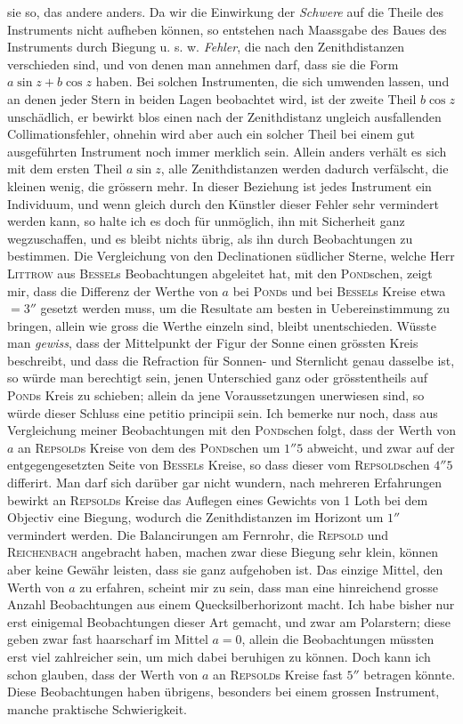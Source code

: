 sie so, das andere anders. Da wir die Einwirkung der \emph{Schwere} auf die Theile des Instruments
nicht aufheben können, so entstehen nach Maassgabe des Baues des Instruments durch Biegung u. s. w.
\emph{Fehler}, die nach den Zenithdistanzen verschieden sind, und von denen man annehmen darf, dass
sie die Form $a\sin z+b\cos z$ haben. Bei solchen Instrumenten, die sich umwenden lassen, und an denen
jeder Stern in beiden Lagen beobachtet wird, ist der zweite Theil $b\cos z$ unschädlich, er bewirkt
blos einen nach der Zenithdistanz ungleich ausfallenden Collimationsfehler, ohnehin wird aber auch ein
solcher Theil bei einem gut ausgeführten Instrument noch immer merklich sein. Allein anders verhält
es sich mit dem ersten Theil $a\sin z$, alle Zenithdistanzen werden dadurch verfälscht, die kleinen
wenig, die grössern mehr. In dieser Beziehung ist jedes Instrument ein Individuum, und wenn gleich
durch den Künstler dieser Fehler sehr vermindert werden kann, so halte ich es doch für unmöglich,
ihn mit Sicherheit ganz wegzuschaffen, und es bleibt nichts übrig, als ihn durch Beobachtungen zu
bestimmen. Die Vergleichung von den Declinationen südlicher Sterne, welche Herr \textsc{Littrow} aus
\textsc{Bessel}s Beobachtungen abgeleitet hat, mit den \textsc{Pond}schen, zeigt mir, dass die Differenz
der Werthe von $a$ bei \textsc{Pond}s und bei \textsc{Bessel}s Kreise etwa $=3''$ gesetzt werden muss,
um die Resultate am besten in Uebereinstimmung zu bringen, allein wie gross die Werthe einzeln sind,
bleibt unentschieden. Wüsste man \emph{gewiss}, dass der Mittelpunkt der Figur der Sonne einen
grössten Kreis beschreibt, und dass die Refraction für Sonnen- und Sternlicht genau dasselbe ist, so
würde man berechtigt sein, jenen Unterschied ganz oder grösstentheils auf \textsc{Pond}s Kreis
zu schieben; allein da jene Voraussetzungen unerwiesen sind, so würde dieser Schluss eine petitio
principii sein. Ich bemerke nur noch, dass aus Vergleichung meiner Beobachtungen mit den
\textsc{Pond}schen folgt, dass der Werth von $a$ an \textsc{Repsold}s Kreise von dem des
\textsc{Pond}schen um $1''5$ abweicht, und zwar auf der entgegengesetzten Seite von \textsc{Bessel}s
Kreise, so dass dieser vom \textsc{Repsold}schen $4''5$ differirt. Man darf sich darüber gar nicht
wundern, nach mehreren Erfahrungen bewirkt an \textsc{Repsold}s Kreise das Auflegen eines Gewichts
von 1 Loth bei dem Objectiv eine Biegung, wodurch die Zenithdistanzen im Horizont um $1''$ vermindert
werden. Die Balancirungen am Fernrohr, die \textsc{Repsold} und \textsc{Reichenbach} angebracht haben,
machen zwar diese Biegung sehr klein, können aber keine Gewähr leisten, dass sie ganz aufgehoben ist.
Das einzige Mittel, den Werth von $a$ zu erfahren, scheint mir zu sein, dass man eine hinreichend
grosse Anzahl Beobachtungen aus einem Quecksilberhorizont macht. Ich habe bisher nur erst einigemal
Beobachtungen dieser Art gemacht, und zwar am Polarstern; diese geben zwar fast haarscharf im Mittel
$a=0$, allein die Beobachtungen müssten erst viel zahlreicher sein, um mich dabei beruhigen zu
können. Doch kann ich schon glauben, dass der Werth von $a$ an \textsc{Repsold}s Kreise fast $5''$
betragen könnte. Diese Beobachtungen haben übrigens, besonders bei einem grossen Instrument, manche
praktische Schwierigkeit.


